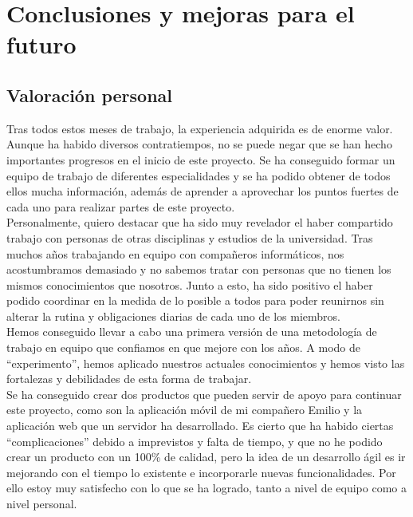 \chapter{Conclusiones y mejoras para el futuro}
\label{ch:conclusiones}

\section{Valoración personal}
Tras todos estos meses de trabajo, la experiencia adquirida es de enorme valor. Aunque ha habido diversos contratiempos, no se puede negar que se han hecho importantes progresos en el inicio de este proyecto. Se ha conseguido formar un equipo de trabajo de diferentes especialidades y se ha podido obtener de todos ellos mucha información, además de aprender a aprovechar los puntos fuertes de cada uno para realizar partes de este proyecto.\\

Personalmente, quiero destacar que ha sido muy revelador el haber compartido trabajo con personas de otras disciplinas y estudios de la universidad. Tras muchos años trabajando en equipo con compañeros informáticos, nos acostumbramos demasiado y no sabemos tratar con personas que no tienen los mismos conocimientos que nosotros. Junto a esto, ha sido positivo el haber podido coordinar en la medida de lo posible a todos para poder reunirnos sin alterar la rutina y obligaciones diarias de cada uno de los miembros.\\

Hemos conseguido llevar a cabo una primera versión de una metodología de trabajo en equipo que confiamos en que mejore con los años. A modo de ``experimento'', hemos aplicado nuestros actuales conocimientos y hemos visto las fortalezas y debilidades de esta forma de trabajar.\\

Se ha conseguido crear dos productos que pueden servir de apoyo para continuar este proyecto, como son la aplicación móvil de mi compañero Emilio y la aplicación web que un servidor ha desarrollado. Es cierto que ha habido ciertas ``complicaciones'' debido a imprevistos y falta de tiempo, y que no he podido crear un producto con un 100\% de calidad, pero la idea de un desarrollo ágil es ir mejorando con el tiempo lo existente e incorporarle nuevas funcionalidades. Por ello estoy muy satisfecho con lo que se ha logrado, tanto a nivel de equipo como a nivel personal.\\

